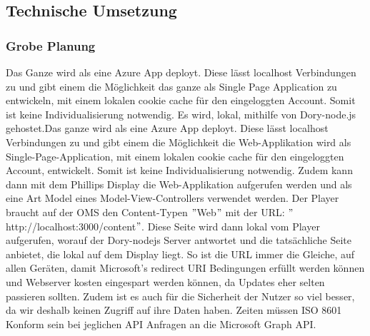
\subsection{Technische Umsetzung}
\subsubsection{Grobe Planung}
Das Ganze wird als eine Azure App deployt.
Diese lässt localhost Verbindungen zu und gibt einem die Möglichkeit das ganze als Single Page Application zu entwickeln, mit einem lokalen cookie cache für den eingeloggten Account.
Somit ist keine Individualisierung notwendig.
\newline
Es wird, lokal, mithilfe von Dory-node.js gehostet.Das ganze wird als eine Azure App deployt.
Diese lässt localhost Verbindungen zu und gibt einem die Möglichkeit die Web-Applikation wird als Single-Page-Application, mit einem lokalen cookie cache für den eingeloggten Account, entwickelt.
Somit ist keine Individualisierung notwendig.
Zudem kann dann mit dem Phillips Display die Web-Applikation aufgerufen werden und als eine Art Model eines Model-View-Controllers verwendet werden.
\newline
Der Player braucht auf der OMS den Content-Typen \("\)Web\("\) mit der URL: \("\)http://localhost:3000/content\("\).
Diese Seite wird dann lokal vom Player aufgerufen, worauf der Dory-nodejs Server antwortet und die tatsächliche Seite anbietet, die lokal auf dem Display liegt.
So ist die URL immer die Gleiche, auf allen Geräten, damit Microsoft's redirect URI Bedingungen erfüllt werden können und Webserver kosten eingespart werden können, da Updates eher selten passieren sollten.
\newline
Zudem ist es auch für die Sicherheit der Nutzer so viel besser, da wir deshalb keinen Zugriff auf ihre Daten haben.
Zeiten müssen ISO 8601 Konform sein bei jeglichen API Anfragen an die Microsoft Graph API\@.
\newline
\pagebreak
